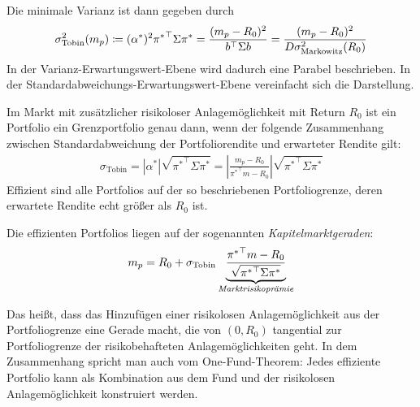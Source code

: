 \documentclass[a4paper,twoside,DIV15,BCOR12mm]{scrbook}
\begin{document}
Die minimale Varianz ist dann gegeben durch
\begin{align*}
\sigma_{\text{Tobin}}^2(m_p) \da (\alpha^*)^2 {\pi^*}^\top\Sigma\pi^* = \frac{(m_p-R_0)^2}{b^\top \Sigma b} = \frac {(m_p-R_0)^2}{D\sigma^2_{\text{Markowitz}}(R_0)}
\end{align*}
In der Varianz-Erwartungswert-Ebene wird dadurch eine Parabel beschrieben. In der Stan\-dard\-ab\-weich\-ungs-Erwartungswert-Ebene vereinfacht sich die Darstellung.

\begin{satz}
Im Markt mit zusätzlicher risikoloser Anlagemöglichkeit mit Return $R_0$ ist ein Portfolio ein Grenzportfolio genau dann, wenn der folgende Zusammenhang zwischen Standardabweichung der Portfoliorendite und erwarteter Rendite gilt:
\begin{align*}
\sigma_{\text{Tobin}} = |\alpha^*| \sqrt{ {\pi^*}^\top\Sigma\pi^*} = \left|
\frac{m_p-R_0}{ {\pi^*}^\top m - R_0 }\right| \sqrt{ {\pi^*}^\top\Sigma\pi^*}
\end{align*}
Effizient sind alle Portfolios auf der so beschriebenen Portfoliogrenze, deren erwartete Rendite echt größer als $R_0$ ist.
\end{satz}

\begin{definition}
Die effizienten Portfolios liegen auf der sogenannten \emph{Kapitelmarktgeraden}:
\begin{align*}
m_p = R_0 + \sigma_{\text{Tobin}} \underbrace{\frac{ {\pi^*}^\top m - R_0}{\sqrt{ {\pi^*}^\top \Sigma \pi^*}}}_{\text{\emph{Marktrisikoprämie}}}
\end{align*}
\end{definition}

Das heißt, dass das Hinzufügen einer risikolosen Anlagemöglichkeit aus der Portfoliogrenze eine Gerade macht, die von $(0,R_0)$ tangential zur Portfoliogrenze der risikobehafteten Anlagemöglichkeiten geht. In dem Zusammenhang spricht man auch vom One-Fund-Theorem: Jedes effiziente Portfolio kann als Kombination aus dem Fund und der risikolosen Anlagemöglichkeit konstruiert werden.
\end{document}
